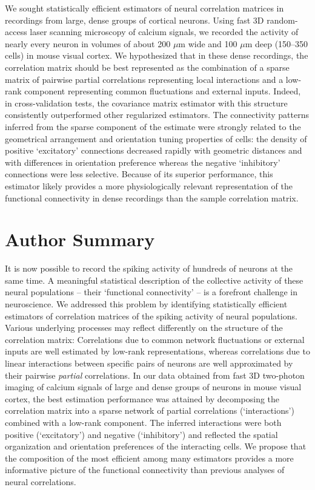 \documentclass[10pt]{article}
\newcommand{\sq}[1]{\lq#1\rq}
\begin{document}
We sought statistically efficient estimators of neural correlation matrices in recordings from large, dense groups of cortical neurons.  Using fast 3D random-access laser scanning microscopy of calcium signals, we recorded the activity of nearly every neuron in volumes of about 200 $\mu$m wide and 100 $\mu$m deep (150--350 cells) in mouse visual cortex.  We hypothesized that in these dense recordings, the correlation matrix should be best represented as the combination of a sparse matrix of pairwise partial correlations representing local interactions and a low-rank component representing common fluctuations and external inputs.  Indeed, in cross-validation tests, the covariance matrix estimator with this structure consistently outperformed other regularized estimators. The connectivity patterns inferred from the sparse component of the estimate were strongly related to the geometrical arrangement and orientation tuning properties of cells: the density of positive \sq{excitatory} connections decreased rapidly with geometric distances and with  differences in orientation preference whereas the negative \sq{inhibitory} connections were less selective.  Because of its superior performance, this estimator likely provides a more physiologically relevant representation of the functional connectivity in dense recordings than the sample correlation matrix.

\section*{Author Summary}

It is now possible to record the spiking activity of hundreds of neurons at the same time.  A meaningful statistical description of the collective activity of these neural populations -- their \sq{functional connectivity} -- is a forefront challenge in neuroscience.  We addressed this problem by identifying statistically efficient estimators of correlation matrices of the spiking activity of neural populations.  Various underlying processes may reflect differently on the structure of the correlation matrix:  Correlations due to common network fluctuations or external inputs are well estimated by low-rank representations, whereas correlations due to linear interactions between specific pairs of neurons are well approximated by their pairwise \emph{partial} correlations.  In our data obtained from fast 3D two-photon imaging of calcium signals of large and dense groups of neurons in mouse visual cortex, the best estimation performance was attained by decomposing the correlation matrix into a sparse network of partial correlations (\sq{interactions}) combined with a low-rank component. The inferred interactions were both positive (\sq{excitatory}) and negative (\sq{inhibitory}) and reflected the spatial organization and orientation preferences of the interacting cells.  We propose that the composition of the most efficient among many estimators provides a more informative picture of the functional connectivity than previous analyses of neural correlations.
\end{document}
